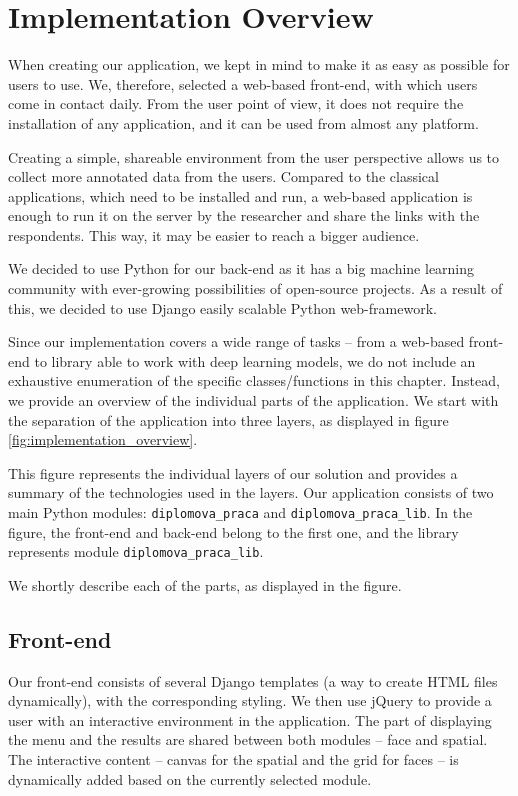 \chapter{Implementation Overview}
\label{ch:developers_guide}
\label{ch:programmers_guide}

When creating our application, we kept in mind to make it as easy as possible for users to use. We, therefore, selected a web-based front-end, with which users come in contact daily. From the user point of view, it does not require the installation of any application, and it can be used from almost any platform.

Creating a simple, shareable environment from the user perspective allows us to collect more annotated data from the users. Compared to the classical applications, which need to be installed and run, a web-based application is enough to run it on the server by the researcher and share the links with the respondents. This way, it may be easier to reach a bigger audience.

We decided to use Python for our back-end as it has a big machine learning community with ever-growing possibilities of open-source projects. As a result of this, we decided to use Django easily scalable Python web-framework.

Since our implementation covers a wide range of tasks -- from a web-based front-end to library able to work with deep learning models, we do not include an exhaustive enumeration of the specific classes/functions in this chapter. Instead, we provide an overview of the individual parts of the application. We start with the separation of the application into three layers, as displayed in figure \ref{fig:implementation_overview}.

This figure represents the individual layers of our solution and provides a summary of the technologies used in the layers. Our application consists of two main Python modules: \verb+diplomova_praca+ and \verb+diplomova_praca_lib+. In the figure, the front-end and back-end belong to the first one, and the library represents module \verb+diplomova_praca_lib+.

We shortly describe each of the parts, as displayed in the figure.

\section{Front-end}

Our front-end consists of several Django templates (a way to create HTML files dynamically), with the corresponding styling. We then use jQuery to provide a user with an interactive environment in the application.  The part of displaying the menu and the results are shared between both modules -- face and spatial. The interactive content -- canvas for the spatial and the grid for faces -- is dynamically added based on the currently selected module.

